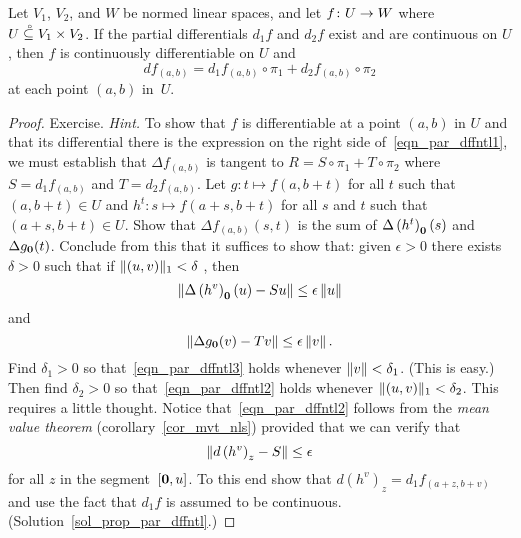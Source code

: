 \begin{prop}\label{prop_par_dffntl}  Let $V_1$, $V_2$, and $W$ be normed linear spaces, and let
$f\colon U \rightarrow W$ where $U\overset{\thickspace{}_\circ}{\subseteq}V_1 \times V_2$.  If the partial differentials $d_1f$ and
$d_2f$ exist and are continuous on $U$, then $f$ is continuously differentiable on $U$ and
 \begin{equation}\label{eqn_par_dffntl1}
   df_{(a,b)} = d_1f_{(a,b)} \circ \pi_1 + d_2f_{(a,b)} \circ \pi_2
 \end{equation}
at each point $(a,b)$ in~$U$.
\end{prop}

\begin{proof}  Exercise.  \emph{Hint.}   To show that $f$ is differentiable at a point $(a,b)$
in $U$ and that its differential there is the expression on the right side
of~\eqref{eqn_par_dffntl1}, we must establish that $\Delta f_{(a,b)}$ is tangent to $R = S
\circ \pi_1 + T \circ \pi_2$ where $S = d_1f_{(a,b)}$ and $T = d_2f_{(a,b)}$.  Let $g \colon t
\mapsto f(a,b + t)$ for all $t$ such that $(a,b + t) \in U$ and $h^t \colon s \mapsto f(a + s,
b + t)$ for all $s$ and $t$ such that $(a + s, b + t) \in U$. Show that $\Delta f_{(a,b)}
(s,t)$ is the sum of $\Delta \left(h^t \right)_{\mathbf{0}}(s)$ and $\Delta g_{\mathbf{0}}(t)$. Conclude
from this that it suffices to show that: given $\epsilon > 0$ there exists $\delta > 0$ such
that if $\lVert(u,v)\rVert_1 < \delta$ , then
 \begin{equation}\label{eqn_par_dffntl2}
   \lVert\Delta\left(h^v\right)_{\mathbf{0}}(u) - Su\rVert \leq \epsilon\,\lVert u\rVert
 \end{equation}
and
 \begin{equation}\label{eqn_par_dffntl3}
    \lVert\Delta g_{\mathbf{0}}(v) - Tv\rVert \leq \epsilon\,\lVert v\rVert\,.
 \end{equation}
Find $\delta_1 > 0$ so that~\eqref{eqn_par_dffntl3} holds whenever $\lVert v\rVert < \delta_1$.
(This is easy.) Then find $\delta_2 > 0$ so that~\eqref{eqn_par_dffntl2} holds whenever
$\lVert(u,v)\rVert_1 < \delta_2$.  This requires a little thought.  Notice
that~\eqref{eqn_par_dffntl2} follows from the \emph{mean value theorem}
(corollary~\ref{cor_mvt_nls}) provided that we can verify that
  \[ \lVert d\left(h^v\right)_z - S\rVert \leq \epsilon \]
for all $z$ in the segment~$[\mathbf{0},u]$.  To this end show that $d\left(h^v\right)_z = d_1f_{(a
+ z, b + v)}$ and use the fact that $d_1f$ is assumed to be continuous.
(Solution~\ref{sol_prop_par_dffntl}.)    \ns
\end{proof}

